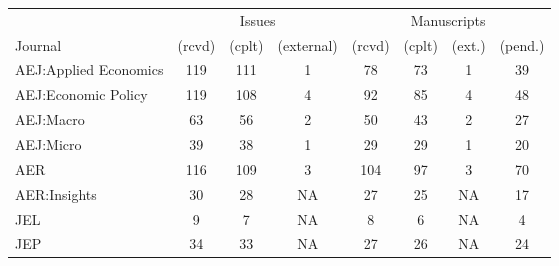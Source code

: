 
\begin{tabular}{@{\extracolsep{5pt}} lccccccc} 
\toprule 
        &\multicolumn{3}{c}{Issues} & \multicolumn{4}{c}{Manuscripts}\\
        \cline{2-4}\cline{5-8}
Journal &  (rcvd) &  (cplt) &  (external) &  (rcvd) &  (cplt) &  (ext.) &  (pend.) \\ 
\midrule AEJ:Applied Economics & 119 & 111 & 1 & 78 & 73 & 1 & 39 \\ 
AEJ:Economic Policy & 119 & 108 & 4 & 92 & 85 & 4 & 48 \\ 
AEJ:Macro & 63 & 56 & 2 & 50 & 43 & 2 & 27 \\ 
AEJ:Micro & 39 & 38 & 1 & 29 & 29 & 1 & 20 \\ 
AER & 116 & 109 & 3 & 104 & 97 & 3 & 70 \\ 
AER:Insights & 30 & 28 & NA & 27 & 25 & NA & 17 \\ 
JEL & 9 & 7 & NA & 8 & 6 & NA & 4 \\ 
JEP & 34 & 33 & NA & 27 & 26 & NA & 24 \\ 
\bottomrule 
\end{tabular} 
